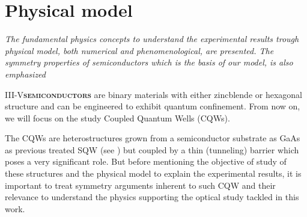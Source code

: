 \chapter{Physical model}
\label{chap:Chapter-2}
\textit{
The fundamental physics concepts to understand the experimental results trough physical model, both numerical and phenomenological, are presented. The symmetry properties of semiconductors which is the basis of our model, is also emphasized
}
\vfill
\minitoc
\newpage

\lettrine[lines=2, lraise=.1, nindent=0mm, slope=0mm]{III-V}{\textbf{semiconductors}} are binary materials with either zincblende or hexagonal structure and can be engineered to exhibit  quantum confinement.  
From now on, we will focus on the study Coupled Quantum Wells  (\gls{CQWs}). 

The \gls{CQWs} are heterostructures grown from a semiconductor substrate as GaAs as previous treated \gls{SQW}
(see ) but coupled by a thin (tunneling) barrier which poses a very significant role. But before mentioning the objective of study of these structures and the physical model to explain the
experimental results, it is important to treat symmetry  arguments inherent to such CQW \cite{van1989laws} and their relevance  to understand the physics supporting  the optical study tackled in this work. 

